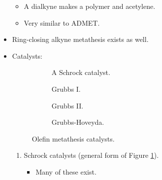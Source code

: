 \documentclass[../notes.tex]{subfiles}
\begin{document}
\begin{itemize}
\begin{itemize}
        \item A dialkyne makes a polymer and acetylene.
        \item Very similar to ADMET.
    \end{itemize}
    \item Ring-closing alkyne metathesis exists as well.
    \item Catalysts:
    \begin{figure}[h!]
        \centering
        \begin{subfigure}[b]{0.25\linewidth}
            \centering
            \caption{A Schrock catalyst.}
            \label{fig:olefinMetathesisCatalystsa}
        \end{subfigure}
        \begin{subfigure}[b]{0.2\linewidth}
            \centering
            \caption{Grubbs I.}
            \label{fig:olefinMetathesisCatalystsb}
        \end{subfigure}
        \begin{subfigure}[b]{0.26\linewidth}
            \centering
            \caption{Grubbs II.}
            \label{fig:olefinMetathesisCatalystsc}
        \end{subfigure}
        \begin{subfigure}[b]{0.27\linewidth}
            \centering
            \caption{Grubbs-Hoveyda.}
            \label{fig:olefinMetathesisCatalystsd}
        \end{subfigure}
        \caption{Olefin metathesis catalysts.}
        \label{fig:olefinMetathesisCatalysts}
    \end{figure}
    \begin{enumerate}
        \item Schrock catalysts (general form of Figure \ref{fig:olefinMetathesisCatalystsa}).
        \begin{itemize}
            \item Many of these exist.
            \begin{itemize}

\end{itemize}
\end{itemize}
\end{enumerate}
\end{itemize}
\end{document}
